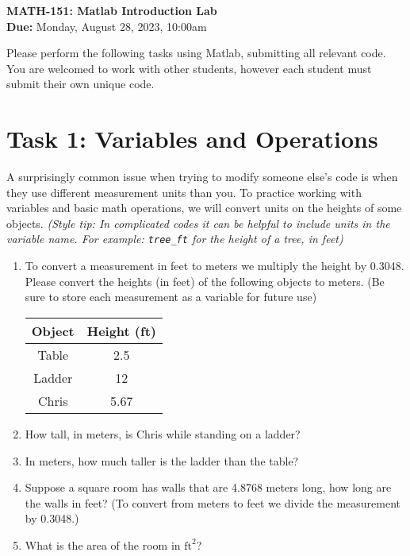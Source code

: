 \documentclass[11pt]{article}
\begin{document}
	
	\begin{center}
		\Large{\textbf{MATH-151: Matlab Introduction Lab}}\\
			\medskip
		\normalsize{\textbf{Due:} Monday, August 28, 2023, 10:00am} 
	\end{center}
	\noindent\makebox[\linewidth]{\rule{\textwidth}{0.4pt}}
	Please perform the following tasks using Matlab, submitting all relevant code. You are welcomed to work with other students, however each student must submit their own unique code.
	\section*{Task 1: Variables and Operations}
	\noindent A surprisingly common issue when trying to modify someone else's code is when they use different measurement units than you. To practice working with variables and basic math operations, we will convert units on the heights of some objects. \textit{(Style tip: In complicated codes it can be helpful to include units in the variable name. For example: \texttt{tree\_ft} for the height of a tree, in feet)}
	\begin{enumerate}[label=\alph*)]
		\item To convert a measurement in feet to meters we multiply the height by 0.3048. Please convert the heights (in feet) of the following objects to meters. (Be sure to store each measurement as a variable for future use)
		\begin{center}
			\begin{tabular}{c | c}
				Object & Height (ft) \\
				\midrule
				Table  & 2.5 \\
				Ladder & 12 \\
				Chris  & 5.67 \\
			\end{tabular}
		\end{center} 
		\item How tall, in meters, is Chris while standing on a ladder?
		\item In meters, how much taller is the ladder than the table?
		\item Suppose a square room has walls that are 4.8768 meters long, how long are the walls in feet? (To convert from meters to feet we divide the measurement by 0.3048.)
		\item What is the area of the room in $\text{ft}^2$?
	\end{enumerate}
\end{document}

